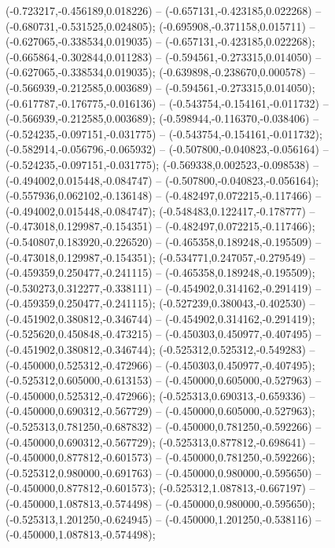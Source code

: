  (-0.723217,-0.456189,0.018226) -- (-0.657131,-0.423185,0.022268) -- (-0.680731,-0.531525,0.024805);
 (-0.695908,-0.371158,0.015711) -- (-0.627065,-0.338534,0.019035) -- (-0.657131,-0.423185,0.022268);
 (-0.665864,-0.302844,0.011283) -- (-0.594561,-0.273315,0.014050) -- (-0.627065,-0.338534,0.019035);
 (-0.639898,-0.238670,0.000578) -- (-0.566939,-0.212585,0.003689) -- (-0.594561,-0.273315,0.014050);
 (-0.617787,-0.176775,-0.016136) -- (-0.543754,-0.154161,-0.011732) -- (-0.566939,-0.212585,0.003689);
 (-0.598944,-0.116370,-0.038406) -- (-0.524235,-0.097151,-0.031775) -- (-0.543754,-0.154161,-0.011732);
 (-0.582914,-0.056796,-0.065932) -- (-0.507800,-0.040823,-0.056164) -- (-0.524235,-0.097151,-0.031775);
 (-0.569338,0.002523,-0.098538) -- (-0.494002,0.015448,-0.084747) -- (-0.507800,-0.040823,-0.056164);
 (-0.557936,0.062102,-0.136148) -- (-0.482497,0.072215,-0.117466) -- (-0.494002,0.015448,-0.084747);
 (-0.548483,0.122417,-0.178777) -- (-0.473018,0.129987,-0.154351) -- (-0.482497,0.072215,-0.117466);
 (-0.540807,0.183920,-0.226520) -- (-0.465358,0.189248,-0.195509) -- (-0.473018,0.129987,-0.154351);
 (-0.534771,0.247057,-0.279549) -- (-0.459359,0.250477,-0.241115) -- (-0.465358,0.189248,-0.195509);
 (-0.530273,0.312277,-0.338111) -- (-0.454902,0.314162,-0.291419) -- (-0.459359,0.250477,-0.241115);
 (-0.527239,0.380043,-0.402530) -- (-0.451902,0.380812,-0.346744) -- (-0.454902,0.314162,-0.291419);
 (-0.525620,0.450848,-0.473215) -- (-0.450303,0.450977,-0.407495) -- (-0.451902,0.380812,-0.346744);
 (-0.525312,0.525312,-0.549283) -- (-0.450000,0.525312,-0.472966) -- (-0.450303,0.450977,-0.407495);
 (-0.525312,0.605000,-0.613153) -- (-0.450000,0.605000,-0.527963) -- (-0.450000,0.525312,-0.472966);
 (-0.525313,0.690313,-0.659336) -- (-0.450000,0.690312,-0.567729) -- (-0.450000,0.605000,-0.527963);
 (-0.525313,0.781250,-0.687832) -- (-0.450000,0.781250,-0.592266) -- (-0.450000,0.690312,-0.567729);
 (-0.525313,0.877812,-0.698641) -- (-0.450000,0.877812,-0.601573) -- (-0.450000,0.781250,-0.592266);
 (-0.525312,0.980000,-0.691763) -- (-0.450000,0.980000,-0.595650) -- (-0.450000,0.877812,-0.601573);
 (-0.525312,1.087813,-0.667197) -- (-0.450000,1.087813,-0.574498) -- (-0.450000,0.980000,-0.595650);
 (-0.525313,1.201250,-0.624945) -- (-0.450000,1.201250,-0.538116) -- (-0.450000,1.087813,-0.574498);
